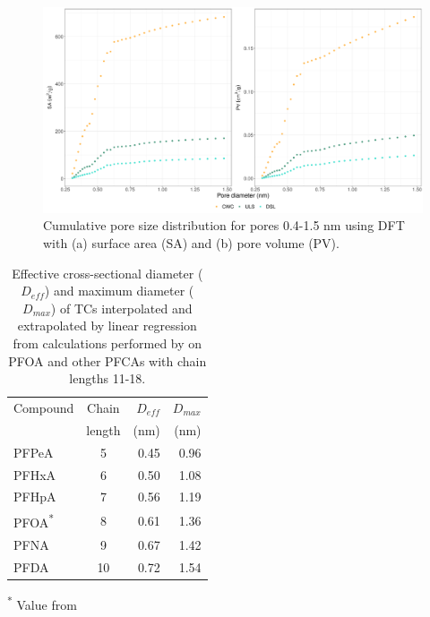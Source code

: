 \begin{figure}[htb]
    \centering
    \includegraphics[width=\textwidth]{R/figs/PZD_SA_PV_small_plot.pdf}
    \caption{Cumulative pore size distribution for pores 0.4-1.5 nm using DFT with (a) surface area (SA) and (b) pore volume (PV).}
    \label{fig:PZD_small}
\end{figure}

\begin{table}
\caption{Effective cross-sectional diameter ($D_{eff}$) and maximum diameter ($D_{max}$) of TCs interpolated and extrapolated by linear regression from calculations performed by \cite{inoue2012size} on PFOA and other PFCAs with chain lengths 11-18.}
\centering
\begin{threeparttable}
\label{tab:molecsize}
\begin{tabular}{lcrr}
\toprule
Compound & Chain & $D_{eff}$ & $D_{max}$ \\ 
& length & (nm) & (nm) \\ \midrule
PFPeA & 5  & 0.45  & 0.96  \\
PFHxA & 6  & 0.50  & 1.08  \\
PFHpA & 7  & 0.56  & 1.19  \\
PFOA\textsuperscript{*} & 8 & 0.61 & 1.36 \\
PFNA & 9 & 0.67 & 1.42  \\
PFDA & 10 & 0.72 & 1.54  \\ \bottomrule                                    
\end{tabular}
\begin{tablenotes}
\item \textsuperscript{*} Value from \cite{inoue2012size}
\end{tablenotes}
\end{threeparttable}
\end{table}

